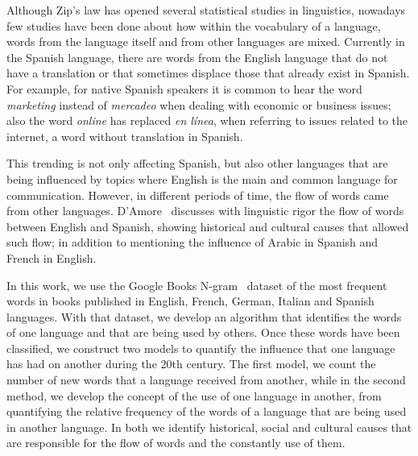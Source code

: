 \documentclass[10pt,letterpaper]{article} %
\begin{document}
Although Zip’s law has opened several statistical studies in linguistics,
nowadays few studies have been done about how within the vocabulary of a
language, words from the language itself and from other languages are
mixed.
Currently in the Spanish language, there are words from the English language
that do not have a translation or that sometimes displace those that already
exist in Spanish.  For example, for native Spanish speakers it is common to
hear the word \textit{marketing} instead of \textit{mercadeo}  when dealing
with economic or
business issues; also the word \textit{online} has replaced \textit{en línea}, when referring to
issues related to the internet, a word without translation in Spanish.
 
This trending is not only affecting  Spanish,  but also other languages that are
being influenced by topics where English is the main and common language for
communication. However, in different periods of time, the flow of words came
from other languages. D’Amore~\cite{Damore_influencia_mutua} discusses with linguistic rigor the
flow of words between English and Spanish,  showing historical  and cultural
causes that allowed such flow; in addition to mentioning the influence of
Arabic in Spanish and French in English. 
 
In this work, we use the Google Books N-gram~\cite{ngramv} dataset of the most
frequent words in books published in  English, French, German, Italian and
Spanish languages.  With that dataset,  we develop an algorithm that identifies
the words of one language  and that are being used by others. Once these words
have been classified, we construct two models to quantify  the influence that
one language has had on another during the 20th century. The first model, we
count the number of new words that a language received from another, while in
the second method, we develop the concept of the use of one language in
another,  from quantifying the relative frequency of  the words of a language
that are being used in another language. In both we identify historical, social
and cultural causes that are responsible for the flow of words and the
constantly use of them.
 
\end{document}
